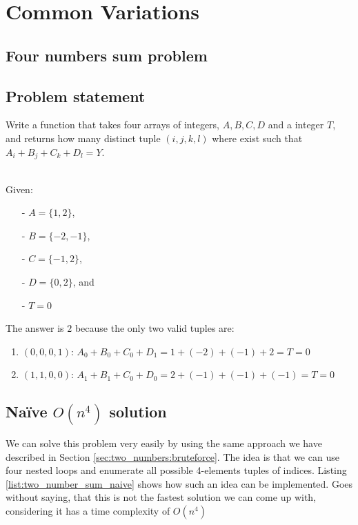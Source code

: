 \section{Common Variations}
\subsection{Four numbers sum problem}
\label{sec:four_number}

\subsection{Problem statement}

\begin{exercise}
Write a function that takes four arrays of integers, $A,B,C,D$ and a integer $T$,
and returns how many distinct tuple $(i,j,k,l)$ where exist such that $A_i+B_j+C_k+D_l = Y$.

\begin{example}
\hfill \\
Given:
	\begin{itemize}
		\item[-] 	$A=\{1,2\}$,
		\item[-] 	$B=\{-2,-1\}$,
		\item[-] 	$C=\{-1,2\}$,
		\item[-]	$D=\{0,2\}$, and 
		\item[-] 	$T = 0$
	\end{itemize}
The answer is $2$ because the only two valid tuples are:
\begin{enumerate}
	\item $(0,0,0,1)$: $A_0 + B_0 + C_0 + D_1 = 1 + (-2) + (-1) + 2 = T = 0$
	\item $(1,1,0,0)$: $A_1 + B_1 + C_0 + D_0 = 2 + (-1) + (-1) + (-1) = T = 0$
\end{enumerate}
\end{example}
\end{exercise}

\subsection{Na\"ive $O(n^4)$ solution}
We can solve this problem very easily by using the same approach we have described in Section \ref{sec:two_numbers:bruteforce}.
The idea is that we can use four nested loops and enumerate all possible 4-elements tuples of indices. Listing \ref{list:two_number_sum_naive} shows how such an idea can be implemented.
Goes without saying, that this is not the fastest solution we can come up with, considering it has a time complexity of $O(n^4)$

